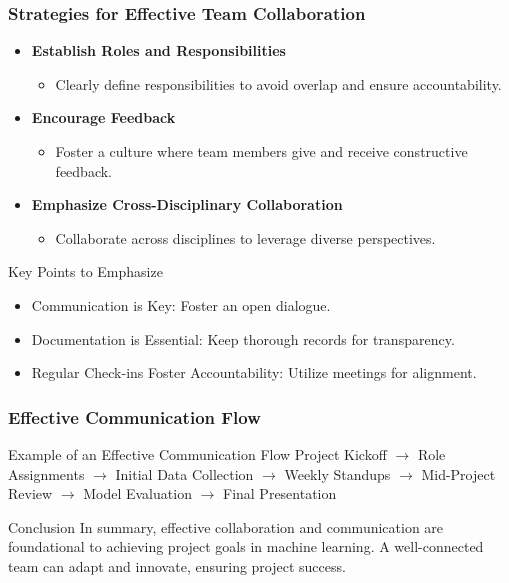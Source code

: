 \documentclass[aspectratio=169]{beamer}
\begin{document}
\begin{frame}[fragile]
    \frametitle{Strategies for Effective Team Collaboration}
    \begin{itemize}
        \item \textbf{Establish Roles and Responsibilities}
            \begin{itemize}
                \item Clearly define responsibilities to avoid overlap and ensure accountability.
            \end{itemize}
        
        \item \textbf{Encourage Feedback}
            \begin{itemize}
                \item Foster a culture where team members give and receive constructive feedback.
            \end{itemize}
        
        \item \textbf{Emphasize Cross-Disciplinary Collaboration}
            \begin{itemize}
                \item Collaborate across disciplines to leverage diverse perspectives.
            \end{itemize}
    \end{itemize}
    \begin{block}{Key Points to Emphasize}
        \begin{itemize}
            \item Communication is Key: Foster an open dialogue.
            \item Documentation is Essential: Keep thorough records for transparency.
            \item Regular Check-ins Foster Accountability: Utilize meetings for alignment.
        \end{itemize}
    \end{block}
\end{frame}

\begin{frame}[fragile]
    \frametitle{Effective Communication Flow}
   \begin{block}{Example of an Effective Communication Flow}
        Project Kickoff $\rightarrow$ Role Assignments $\rightarrow$ Initial Data Collection $\rightarrow$ Weekly Standups $\rightarrow$ Mid-Project Review $\rightarrow$ Model Evaluation $\rightarrow$ Final Presentation
    \end{block}
    \begin{block}{Conclusion}
        In summary, effective collaboration and communication are foundational to achieving project goals in machine learning. A well-connected team can adapt and innovate, ensuring project success.
    \end{block}
\end{frame}
\end{document}
